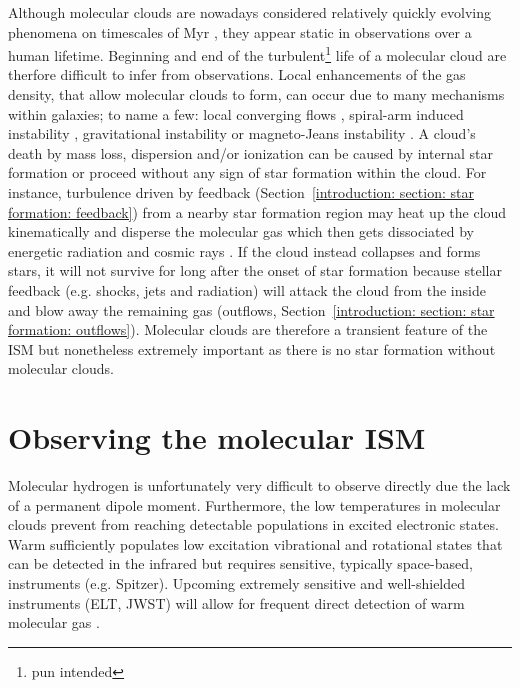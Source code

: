 Although molecular clouds are nowadays considered relatively quickly evolving phenomena on timescales of Myr \citep[e.g.][]{2007prpl.conf...63B,Kruijssen:2019ej}, they appear static in observations over a human lifetime. Beginning and end of the turbulent\footnote{pun intended} life of a molecular cloud are therfore difficult to infer from observations.
Local enhancements of the gas density, that allow molecular clouds to form, can occur due to many mechanisms within galaxies; to name a few: local converging flows \citep[e.g.][]{2005A&A...433....1A}, spiral-arm induced instability \citep[e.g.][]{2002ApJ...577..206E}, gravitational instability \citep[e.g.][]{2010A&A...518L.102A} or magneto-Jeans instability \citep[e.g.][]{2002ApJ...581.1080K}. 
A cloud's death by mass loss, dispersion and/or ionization can be caused by internal star formation or proceed without any sign of star formation within the cloud. For instance, turbulence driven by feedback (Section~\ref{introduction: section: star formation: feedback}) from a nearby star formation region may heat up the cloud kinematically and disperse the molecular gas which then gets dissociated by energetic radiation and cosmic rays \citep[e.g.][]{1999RvMP...71..173H}. If the cloud instead collapses and forms stars, it will not survive for long after the onset of star formation because stellar feedback (e.g. shocks, jets and radiation) will attack the cloud from the inside and blow away the remaining gas (outflows, Section~\ref{introduction: section: star formation: outflows}). 
Molecular clouds are therefore a transient feature of the ISM but nonetheless extremely important as there is no star formation without molecular clouds.



\section{Observing the molecular ISM}
\label{introdution: section: ism: observations}

Molecular hydrogen is unfortunately very difficult to observe directly \citep[e.g.][]{1966SSRv....5..419V} due the lack of a permanent dipole moment. Furthermore, the low temperatures in molecular clouds prevent \htwo from reaching detectable populations in excited electronic states. Warm \htwo sufficiently populates low excitation vibrational and rotational states that can be detected in the infrared but requires sensitive, typically space-based, instruments (e.g. Spitzer).
Upcoming extremely sensitive and well-shielded instruments (ELT, JWST) will allow for frequent direct detection of warm molecular gas \citep[e.g.][]{2016AAS...22740902T}.

